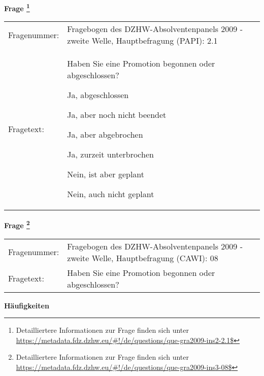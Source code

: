 				\vspace*{0.5cm}
                \noindent\textbf{Frage
	                \footnote{Detailliertere Informationen zur Frage finden sich unter
		              \url{https://metadata.fdz.dzhw.eu/\#!/de/questions/que-gra2009-ins2-2.1$}}}\\
				\begin{tabularx}{\hsize}{@{}lX}
					Fragenummer: &
					  Fragebogen des DZHW-Absolventenpanels 2009 - zweite Welle, Hauptbefragung (PAPI):
					  2.1
 \\
					Fragetext: & Haben Sie eine Promotion begonnen oder abgeschlossen?\par  Ja, abgeschlossen\par  Ja, aber noch nicht beendet\par  Ja, aber abgebrochen\par  Ja, zurzeit unterbrochen\par  Nein, ist aber geplant\par  Nein, auch nicht geplant \\
				\end{tabularx}
				\vspace*{0.5cm}
                \noindent\textbf{Frage
	                \footnote{Detailliertere Informationen zur Frage finden sich unter
		              \url{https://metadata.fdz.dzhw.eu/\#!/de/questions/que-gra2009-ins3-08$}}}\\
				\begin{tabularx}{\hsize}{@{}lX}
					Fragenummer: &
					  Fragebogen des DZHW-Absolventenpanels 2009 - zweite Welle, Hauptbefragung (CAWI):
					  08
 \\
					Fragetext: & Haben Sie eine Promotion begonnen oder abgeschlossen? \\
				\end{tabularx}





        		\vspace*{0.5cm}
                \noindent\textbf{Häufigkeiten}


